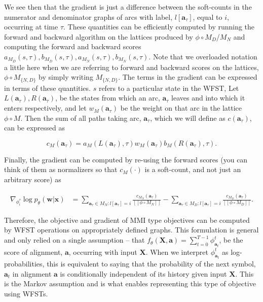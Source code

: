 We see then that the gradient is just a difference between the soft-counts in the numerator and denominator graphs of arcs with label, $l\left[\mathbf{a}_\tau\right]$, equal to $i$, occurring at time $\tau$. These quantities can be efficiently computed by running the forward and backward algorithm on the lattices produced by $\phi \circ M_D$/$M_N$ and computing the forward and backward scores $a_{M_D}\left(s, \tau\right), b_{M_D}\left(s, \tau\right), a_{M_N}\left(s, \tau\right),b_{M_N}\left(s, \tau\right)$. Note that we overloaded notation a little here when we are referring to forward and backward scores on the lattices, $\phi \circ M_{\{N,D\}}$ by simply writing $M_{\{N,D\}}$. The terms in the gradient can be expressed in terms of these quantities. $s$ refers to a particular state in the WFST, Let $L\left(\mathbf{a}_\tau\right), R\left(\mathbf{a}_\tau\right)$, be the states from which an arc, $\mathbf{a}_\tau$ leaves and into which it enters respectively, and let $w_M\left(\mathbf{a}_\tau\right)$ be the weight on that arc in the lattice $\phi \circ M$. Then the sum of all paths taking arc, $\mathbf{a}_\tau$, which we will define as $c\left(\mathbf{a}_\tau\right)$, can be expressed as 

\begin{equation}
    c_M\left(\mathbf{a}_\tau\right) = a_{M}\left(L\left(\mathbf{a}_\tau\right), \tau\right)w_M\left(\mathbf{a}_\tau\right) b_{M}\left(R\left(\mathbf{a}_\tau\right), \tau\right).
\end{equation}

Finally, the gradient can be computed by re-using the forward scores (you can think of them as normalizers so that $c_M\left(\cdot\right)$ is a soft-count, and not just an arbitrary score) as

\begin{align}
     \nabla_{\phi_{i}^\tau}\log{ p_\theta\left(\mathbf{w} | \mathbf{x}\right)} &= \sum_{\mathbf{a}_\tau \in M_N : l\left[\mathbf{a}_\tau\right] = i}\frac{c_{M_N}\left(\mathbf{a}_\tau\right)}{[\![\phi \circ M_N]\!]} - \sum_{\mathbf{a}_\tau \in M_D : l\left[\mathbf{a}_\tau\right] = i}\frac{c_{M_D}\left(\mathbf{a}_\tau\right)}{[\![\phi \circ M_D]\!]}.
\end{align}

Therefore, the objective and gradient of MMI type objectives can be computed by WFST operations on appropriately defined graphs. This formulation is general and only relied on a single assumption -- that $f_\theta\left(\mathbf{X}, \mathbf{a}\right) = \sum_{t=0}^{T-1}\phi_{\mathbf{a}_t}^t$, be the score of alignment, $\mathbf{a}$, occurring with input $\mathbf{X}$. When we interpret $\phi_{\mathbf{a}_t}^t$ as log-probabilities, this is equivalent to saying that the probability of the next symbol, $\mathbf{a}_t$ in alignment $\mathbf{a}$ is conditionally independent of its history given input $\mathbf{X}$. This is the Markov assumption and is what enables representing this type of objective using WFSTs.
